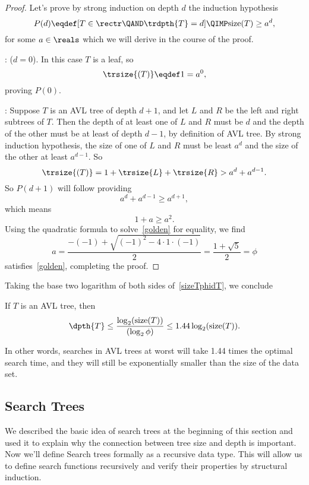 \begin{definition}
\begin{lemma}
\begin{proof}
Let's prove by strong induction on depth $d$ the induction hypothesis
\[
P(d) \eqdef [T \in \rectr \QAND \trdpth{T} = d] \QIMP \text{size}(T)
\geq a^d,
\]
for some $a \in \reals$ which we will derive in the course of the
proof.

: ($d=0$).
In this case $T$ is a leaf, so
\[
\trsize{(T)} \eqdef 1 = a^0,
\]
proving $P(0)$.

: Suppose $T$ is an AVL tree of depth
$d+1$, and let $L$ and $R$ be the left and right subtrees of $T$.
Then the depth of at least one of $L$ and $R$ must be $d$ and the
depth of the other must be at least of depth $d-1$, by definition of
AVL tree.  By strong induction hypothesis, the size of one of $L$ and
$R$ must be least $a^d$ and the size of the other at least $a^{d-1}$.
So
\[
\trsize{(T)}
  = 1 + \trsize{L} + \trsize{R}
  > a^d + a^{d-1}.
\]            
So $P(d+1)$ will follow providing
\[
 a^d + a^{d-1} \geq a^{d+1},
\]
which means
\begin{equation}\label{golden}
1+a \geq a^2.
\end{equation}
Using the quadratic formula to solve~\eqref{golden} for equality, we find
\[
a = \frac{-(-1) + \sqrt{(-1)^2-4\cdot 1\cdot (-1)}}{2} = \frac{1 + \sqrt{5}}{2} = \phi
\]
satisfies~\eqref{golden}, completing the proof.
\end{proof}
\end{lemma}

Taking the base two logarithm of both sides of~\eqref{sizeTphidT}, we conclude
\begin{corollary}
If $T$ is an AVL tree, then
\[
\dpth{T} \leq \frac{\log_2(\text{size}(T))}{(\log_2 \phi)} \leq 1.44
\log_2(\text{size}(T)).
\]
\end{corollary}
In other words, searches in AVL trees at worst will take 1.44 times
the optimal search time, and they will still be exponentially smaller
than the size of the data set.

\subsection{Search Trees}
We described the basic idea of search trees at the beginning of this
section and used it to explain why the connection between tree size
and depth is important.  Now we'll define Search trees formally as a
recursive data type.  This will allow us to define search functions
recursively and verify their properties by structural induction.


\end{definition}
